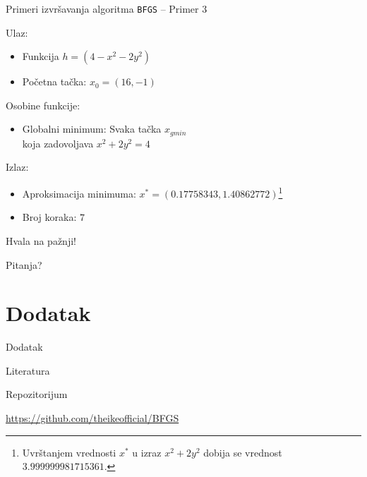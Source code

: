 \documentclass[serbian]{beamer}
\begin{document}
\begin{frame}{Primeri izvr\v savanja algoritma \texttt{BFGS} -- Primer 3}

Ulaz:
\begin{itemize}
	\item Funkcija $h = (4 - x^2 - 2y^2)$
	\item Po\v cetna ta\v cka: $x_0 = (16, -1)$
\end{itemize}

Osobine funkcije:
\begin{itemize}
	\item Globalni minimum: Svaka ta\v cka $x_{gmin}$ \\ 
	koja zadovoljava $x^2 + 2y^2 = 4$
\end{itemize}

Izlaz:
\begin{itemize}
	\item Aproksimacija minimuma: $x^* = (0.17758343, 1.40862772)$\footnote{Uvr\v stanjem vrednosti $x^*$ u izraz $x^2 + 2y^2$ dobija se vrednost $3.999999981715361$.}
	\item Broj koraka: $7$
\end{itemize}

\end{frame}

\begin{frame}

\vspace*{3em}

{\Large Hvala na pa\v znji!} 

\vspace*{1em}

Pitanja?

\end{frame}

\section{Dodatak}

\begin{frame}{Dodatak}

\begin{flushleft}
	{\Large Literatura}
\end{flushleft}

\nocite{NumOpt}

\printbibliography

\begin{flushleft}
	{\Large Repozitorijum}
\end{flushleft}

\href{https://github.com/theikeofficial/BFGS}{https://github.com/theikeofficial/BFGS}

\end{frame}
\end{document}
